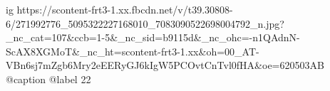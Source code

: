  
 
 
 
 

\ifcmt
  ig https://scontent-frt3-1.xx.fbcdn.net/v/t39.30808-6/271992776_5095322227168010_7083090522698004792_n.jpg?_nc_cat=107&ccb=1-5&_nc_sid=b9115d&_nc_ohc=-n1QAdnN-ScAX8XGMoT&_nc_ht=scontent-frt3-1.xx&oh=00_AT-VBn6sj7mZgb6Mry2eEERyGJ6kIgW5PCOvtCnTvl0fHA&oe=620503AB
  @caption @label 22
\fi
